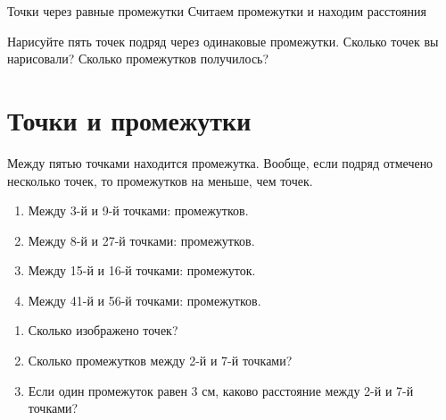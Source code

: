 
\worksheettitle
  {Точки через равные промежутки}
  {Считаем промежутки и находим расстояния}

\studentnameblock

\begin{checkpointbox}
  Нарисуйте пять точек подряд через одинаковые промежутки. Сколько точек вы
  нарисовали? Сколько промежутков получилось?
\end{checkpointbox}

\section{Точки и промежутки}

\pointsvsintervalsfigure

\begin{fillbox}
  Между пятью точками находится \answerblank[18mm] промежутка. Вообще, если
  подряд отмечено несколько точек, то промежутков на \answerblank[18mm]
  меньше, чем точек.
\end{fillbox}

\begin{practicebox}
  \begin{enumerate}[label=\alph*),itemsep=0.55em]
    \item Между 3-й и 9-й точками: \answerblank[24mm] промежутков.
    \item Между 8-й и 27-й точками: \answerblank[24mm] промежутков.
    \item Между 15-й и 16-й точками: \answerblank[24mm] промежуток.
    \item Между 41-й и 56-й точками: \answerblank[24mm] промежутков.
  \end{enumerate}
\end{practicebox}

\studentcountstrip

\begin{practicebox}
  \begin{enumerate}[label=\alph*),itemsep=0.55em]
    \item Сколько изображено точек? \answerblank[20mm]
    \item Сколько промежутков между 2-й и 7-й точками? \answerblank[20mm]
    \item Если один промежуток равен \(3\) см, каково расстояние между
      2-й и 7-й точками? \answerblank[35mm]
  \end{enumerate}
\end{practicebox}

